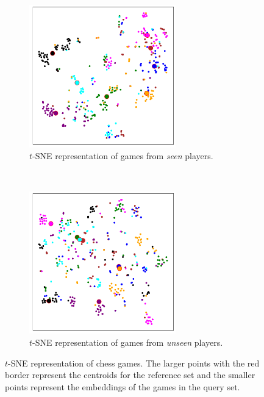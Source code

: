 \begin{figure}[ht!]
    \centering
    \begin{subfigure}[t]{0.49\textwidth}
        \centering
        \includegraphics[width=2.5in]{figures/tsne-seen.png}
        \caption{$t$-SNE representation of games from \emph{seen} players.}
    \end{subfigure}%
    ~ 
    \begin{subfigure}[t]{0.49\textwidth}
        \centering
        \includegraphics[width=2.5in]{figures/tsne-unseen.png}
        \caption{$t$-SNE representation of games from \emph{unseen} players.}
    \end{subfigure}
    \caption{$t$-SNE representation of chess games. The larger points with the red border represent the centroids for the reference set and the smaller points represent the embeddings of the games in the query set.}
    \label{fig:tsne}
\end{figure}
